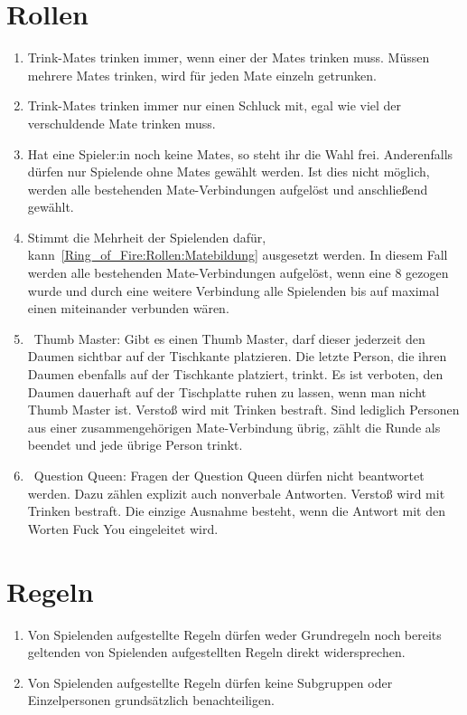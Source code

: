 \section{Rollen}
\begin{enumerate}[label={(\arabic*)}]
	\item
	Trink-Mates trinken immer, wenn einer der Mates trinken muss.
	Müssen mehrere Mates trinken, wird für jeden Mate einzeln getrunken.
	
	\item
	Trink-Mates trinken immer nur einen Schluck mit, egal wie viel der verschuldende Mate trinken muss.

	\item\label{Ring_of_Fire:Rollen:Matebildung}
	Hat eine Spieler:in noch keine Mates, so steht ihr die Wahl frei.
	Anderenfalls dürfen nur Spielende ohne Mates gewählt werden.
	Ist dies nicht möglich, werden alle bestehenden Mate-Verbindungen aufgelöst und anschließend gewählt.
	
	\item
	Stimmt die Mehrheit der Spielenden dafür, kann~\ref{Ring_of_Fire:Rollen:Matebildung} ausgesetzt werden.
	In diesem Fall werden alle bestehenden Mate-Verbindungen aufgelöst, wenn eine 8 gezogen wurde und durch eine weitere Verbindung alle Spielenden bis auf maximal einen miteinander verbunden wären.
	
	\item\label{Ring_of_Fire:Rollen:Thumb_Master}
~\glqq{}Thumb Master\grqq{}: Gibt es einen Thumb Master, darf dieser jederzeit den Daumen sichtbar auf der Tischkante platzieren.
	Die letzte Person, die ihren Daumen ebenfalls auf der Tischkante platziert, trinkt.
	Es ist verboten, den Daumen dauerhaft auf der Tischplatte ruhen zu lassen, wenn man nicht Thumb Master ist.
	Verstoß wird mit Trinken bestraft.
	Sind lediglich Personen aus einer zusammengehörigen Mate-Verbindung übrig, zählt die Runde als beendet und jede übrige Person trinkt.
	
	\item\label{Ring_of_Fire:Rollen:Question_Queen}
~\glqq{}Question Queen\grqq{}: Fragen der Question Queen dürfen nicht beantwortet werden.
	Dazu zählen explizit auch nonverbale Antworten. Verstoß wird mit Trinken bestraft.
	Die einzige Ausnahme besteht, wenn die Antwort mit den Worten \glqq{}Fuck You\grqq{} eingeleitet wird.
\end{enumerate}

\section{Regeln}\label{Ring_of_Fire:Regeln}
\begin{enumerate}[label={(\arabic*)}]
	\item
	Von Spielenden aufgestellte Regeln dürfen weder Grundregeln noch bereits geltenden von Spielenden aufgestellten Regeln direkt widersprechen.
	
	\item
	Von Spielenden aufgestellte Regeln dürfen keine Subgruppen oder Einzelpersonen grundsätzlich benachteiligen.
\end{enumerate}
